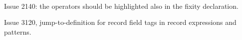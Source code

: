 \documentclass{article}
\begin{document}
\begin{code}%
\>[0]\<%
\\
\>[0]\<%
\\
\>[0]\<%
\\
\>[0]\AgdaComment{--\ \ \ )}\<%
\\
%
\\[\AgdaEmptyExtraSkip]%
\>[0]\AgdaSpace{}%
\AgdaSpace{}%
\AgdaSymbol{(}\AgdaSpace{}%
\AgdaSymbol{:}\AgdaSpace{}%
\AgdaSymbol{)}\AgdaSpace{}%
\AgdaSymbol{:}\AgdaSpace{}%
\AgdaSpace{}%
\<%
\\
\>[0][@{}l@{\AgdaIndent{0}}]%
\>[2]\AgdaSpace{}%
\AgdaSymbol{:}\AgdaSpace{}%
\AgdaSpace{}%
\AgdaSpace{}%
\AgdaSymbol{=}\AgdaSpace{}%
\AgdaSpace{}%
\AgdaSpace{}%
\AgdaSpace{}%
\<%
\\
%
\\[\AgdaEmptyExtraSkip]%
\>[0]\AgdaSpace{}%
\AgdaSpace{}%
\<%
\\
\>[0][@{}l@{\AgdaIndent{0}}]%
\>[2]\AgdaSpace{}%
\AgdaOperator{\AgdaPostulate{\AgdaUnderscore{}+\AgdaUnderscore{}}}\AgdaSpace{}%
\AgdaSpace{}%
\AgdaSymbol{:}\AgdaSpace{}%
\AgdaSpace{}%
\AgdaSpace{}%
\AgdaSpace{}%
\AgdaSpace{}%
\<%
\\
%
\\[\AgdaEmptyExtraSkip]%
%
\>[2]\AgdaSpace{}%
\AgdaSpace{}%
\AgdaSpace{}%
\AgdaOperator{\AgdaPostulate{\AgdaUnderscore{}+\AgdaUnderscore{}}}\<%
\end{code}

Issue 2140: the operators should be highlighted also in the fixity declaration.

Issue 3120, jump-to-definition for record field tags in record expressions and patterns.
\end{document}
